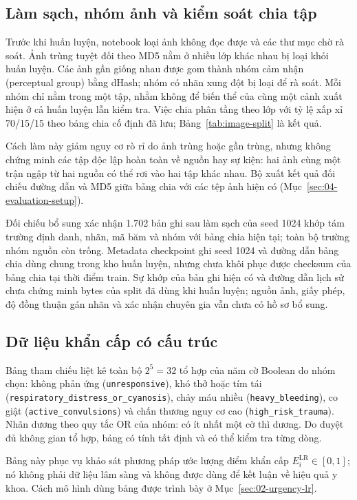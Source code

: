 \subsection{Làm sạch, nhóm ảnh và kiểm soát chia tập}
Trước khi huấn luyện, notebook loại ảnh không đọc được và các thư mục chờ rà soát. Ảnh trùng tuyệt đối theo MD5 nằm ở nhiều lớp khác nhau bị loại khỏi huấn luyện. Các ảnh gần giống nhau được gom thành nhóm cảm nhận (perceptual group) bằng dHash; nhóm có nhãn xung đột bị loại để rà soát. Mỗi nhóm chỉ nằm trong một tập, nhằm không để biến thể của cùng một cảnh xuất hiện ở cả huấn luyện lẫn kiểm tra. Việc chia phân tầng theo lớp với tỷ lệ xấp xỉ 70/15/15 theo bảng chia cố định đã lưu; Bảng~\ref{tab:image-split} là kết quả.

Cách làm này giảm nguy cơ rò rỉ do ảnh trùng hoặc gần trùng, nhưng không chứng minh các tập độc lập hoàn toàn về nguồn hay sự kiện: hai ảnh cùng một trận ngập từ hai nguồn có thể rơi vào hai tập khác nhau. Bộ xuất kết quả đối chiếu đường dẫn và MD5 giữa bảng chia với các tệp ảnh hiện có (Mục~\ref{sec:04-evaluation-setup}).

Đối chiếu bổ sung xác nhận 1.702 bản ghi sau làm sạch của seed 1024 khớp tám trường định danh, nhãn, mã băm và nhóm với bảng chia hiện tại; toàn bộ trường nhóm nguồn còn trống. Metadata checkpoint ghi seed 1024 và đường dẫn bảng chia dùng chung trong kho huấn luyện, nhưng chưa khôi phục được checksum của bảng chia tại thời điểm train. Sự khớp của bản ghi hiện có và đường dẫn lịch sử chưa chứng minh bytes của split đã dùng khi huấn luyện; nguồn ảnh, giấy phép, độ đồng thuận gán nhãn và xác nhận chuyên gia vẫn chưa có hồ sơ bổ sung.

\subsection{Dữ liệu khẩn cấp có cấu trúc}
Bảng tham chiếu liệt kê toàn bộ $2^5=32$ tổ hợp của năm cờ Boolean do nhóm chọn: không phản ứng (\texttt{unresponsive}), khó thở hoặc tím tái (\texttt{respiratory\_\allowbreak{}distress\_\allowbreak{}or\_\allowbreak{}cyanosis}), chảy máu nhiều (\texttt{heavy\_bleeding}), co giật (\texttt{active\_convulsions}) và chấn thương nguy cơ cao (\texttt{high\_risk\_trauma}). Nhãn dương theo quy tắc OR của nhóm: có ít nhất một cờ thì dương. Do duyệt đủ không gian tổ hợp, bảng có tính tất định và có thể kiểm tra từng dòng.

Bảng này phục vụ khảo sát phương pháp ước lượng điểm khẩn cấp $E_i^{\mathrm{LR}}\in[0,1]$; nó không phải dữ liệu lâm sàng và không được dùng để kết luận về hiệu quả y khoa. Cách mô hình dùng bảng được trình bày ở Mục~\ref{sec:02-urgency-lr}.

